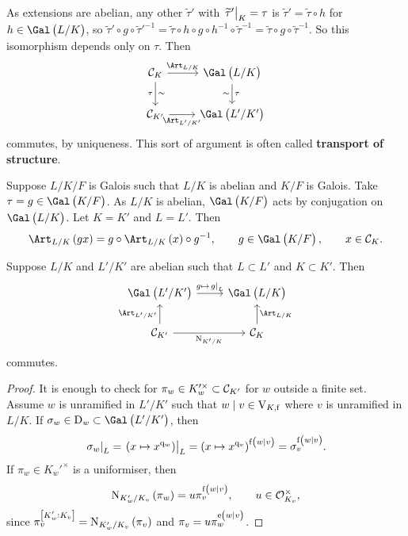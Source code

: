 \pagebreak

As extensions are abelian, any other $ \widetilde{\tau}' $ with $ \left. \widetilde{\tau}' \right|_K = \tau $ is $ \widetilde{\tau}' = \widetilde{\tau} \circ h $ for $ h \in \Gal\br{L / K} $, so $ \widetilde{\tau}' \circ g \circ \widetilde{\tau}'^{-1} = \widetilde{\tau} \circ h \circ g \circ h^{-1} \circ \widetilde{\tau}^{-1} = \widetilde{\tau} \circ g \circ \widetilde{\tau}^{-1} $. So this isomorphism depends only on $ \tau $. Then
$$
\begin{tikzcd}
\CCC_K \arrow{r}{\Art_{L / K}} \arrow{d}{\sim}[swap]{\tau} & \Gal\br{L / K} \arrow{d}{\tau}[swap]{\sim} \\
\CCC_{K'} \arrow{r}[swap]{\Art_{L' / K'}} & \Gal\br{L' / K'}
\end{tikzcd}
$$
commutes, by uniqueness. This sort of argument is often called \textbf{transport of structure}.

\begin{example*}
Suppose $ L / K / F $ is Galois such that $ L / K $ is abelian and $ K / F $ is Galois. Take $ \tau = g \in \Gal\br{K / F} $. As $ L / K $ is abelian, $ \Gal\br{K / F} $ acts by conjugation on $ \Gal\br{L / K} $. Let $ K = K' $ and $ L = L' $. Then
\begin{equation}
\label{eq:5}
\Art_{L / K}\br{gx} = g \circ \Art_{L / K}\br{x} \circ g^{-1}, \qquad g \in \Gal\br{K / F}, \qquad x \in \CCC_K.
\end{equation}
\end{example*}

\begin{proposition}
Suppose $ L / K $ and $ L' / K' $ are abelian such that $ L \subset L' $ and $ K \subset K' $. Then
$$
\begin{tikzcd}
\Gal\br{L' / K'} \arrow{r}{g \mapsto \eval{g}_L} & \Gal\br{L / K} \\
\CCC_{K'} \arrow{u}{\Art_{L' / K'}} \arrow{r}[swap]{\N_{K' / K}} & \CCC_K \arrow{u}[swap]{\Art_{L / K}}
\end{tikzcd}
$$
commutes.
\end{proposition}

\begin{proof}
It is enough to check for $ \pi_w \in K_w'^\times \subset \mathcal{C}_{K'} $ for $ w $ outside a finite set. Assume $ w $ is unramified in $ L' / K' $ such that $ w \mid v \in \mathrm{V}_{K, \mathrm{f}} $ where $ v $ is unramified in $ L / K $. If $ \sigma_w \in \D_w \subset \Gal\br{L' / K'} $, then
$$ \eval{\sigma_w}_L = \eval{\br{x \mapsto x^{\q_w}}}_L = \br{x \mapsto x^{\q_v}}^{\f\br{w \mid v}} = \sigma_v^{\f\br{w \mid v}}. $$
If $ \pi_w \in K_w'^\times $ is a uniformiser, then
$$ \N_{K_w' / K_v}\br{\pi_w} = u\pi_v^{\f\br{w \mid v}}, \qquad u \in \OOO_{K_v}^\times, $$
since $ \pi_v^{\sbr{K_w' : K_v}} = \N_{K_w' / K_v}\br{\pi_v} $ and $ \pi_v = u\pi_w^{\e\br{w \mid v}} $.
\end{proof}

